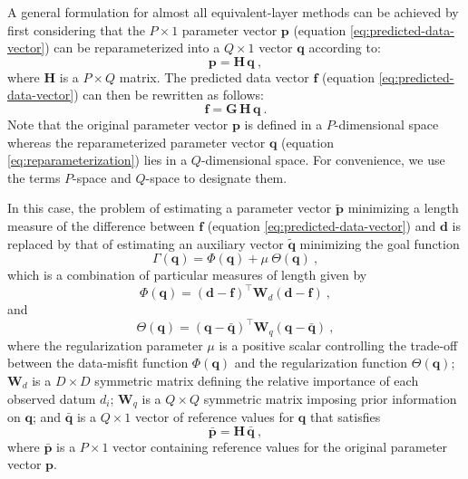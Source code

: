 A general formulation for almost all equivalent-layer methods can be achieved by first considering 
that the $P \times 1$ parameter vector $\mathbf{p}$ (equation \ref{eq:predicted-data-vector}) can be reparameterized 
into a $Q \times 1$ vector $\mathbf{q}$ according to:
\begin{equation}
	\mathbf{p} = \mathbf{H} \, \mathbf{q} \: ,
	\label{eq:reparameterization}
\end{equation}
where $\mathbf{H}$ is a $P \times Q$ matrix.
The predicted data vector $\mathbf{f}$ (equation \ref{eq:predicted-data-vector}) can then be
rewritten as follows:
\begin{equation}
	\mathbf{f} = \mathbf{G} \, \mathbf{H} \, \mathbf{q} \: .
	\label{eq:predicted-data-vetor-reparameterized}
\end{equation}
Note that the original parameter vector $\mathbf{p}$ is defined in a $P$-dimensional space whereas the reparameterized
parameter vector $\mathbf{q}$ (equation \ref{eq:reparameterization}) lies in a $Q$-dimensional space.
For convenience, we use the terms $P$-space and $Q$-space to designate them.

In this case, the problem of estimating a parameter vector $\tilde{\mathbf{p}}$ minimizing a length 
measure of the difference between $\mathbf{f}$ (equation \ref{eq:predicted-data-vector}) and $\mathbf{d}$
is replaced by that of estimating an auxiliary vector $\tilde{\mathbf{q}}$ minimizing the goal function
\begin{equation}
	\Gamma(\mathbf{q}) = \Phi(\mathbf{q}) + \mu \: \Theta(\mathbf{q}) \: ,
	\label{eq:function-Gamma}
\end{equation}
which is a combination of particular measures of length given by
\begin{equation}
	\Phi(\mathbf{q}) = \left( \mathbf{d} - \mathbf{f} \right)^{\top}\mathbf{W}_{d}\left( \mathbf{d} - \mathbf{f} \right) \: ,
	\label{eq:function-Phi}
\end{equation}
and
\begin{equation}
	\Theta(\mathbf{q}) = \left( \mathbf{q} - \bar{\mathbf{q}} \right)^{\top}\mathbf{W}_{q}\left( \mathbf{q} - \bar{\mathbf{q}} \right) \: ,
	\label{eq:function-Theta}
\end{equation}
where the regularization parameter $\mu$ is a positive scalar controlling the trade-off between the data-misfit function 
$\Phi(\mathbf{q})$ and the regularization function $\Theta(\mathbf{q})$; 
$\mathbf{W}_{d}$ is a $D \times D$ symmetric matrix defining the relative importance of each observed datum $d_{i}$;
$\mathbf{W}_{q}$ is a $Q \times Q$ symmetric matrix imposing prior information on $\mathbf{q}$;
and $\bar{\mathbf{q}}$ is a $Q \times 1$ vector of reference values for $\mathbf{q}$ that satisfies
\begin{equation}
	\bar{\mathbf{p}} = \mathbf{H} \, \bar{\mathbf{q}} \: ,
	\label{eq:reparameterization-reference}
\end{equation}
where $\bar{\mathbf{p}}$ is a $P \times 1$ vector containing reference values
for the original parameter vector $\mathbf{p}$.

